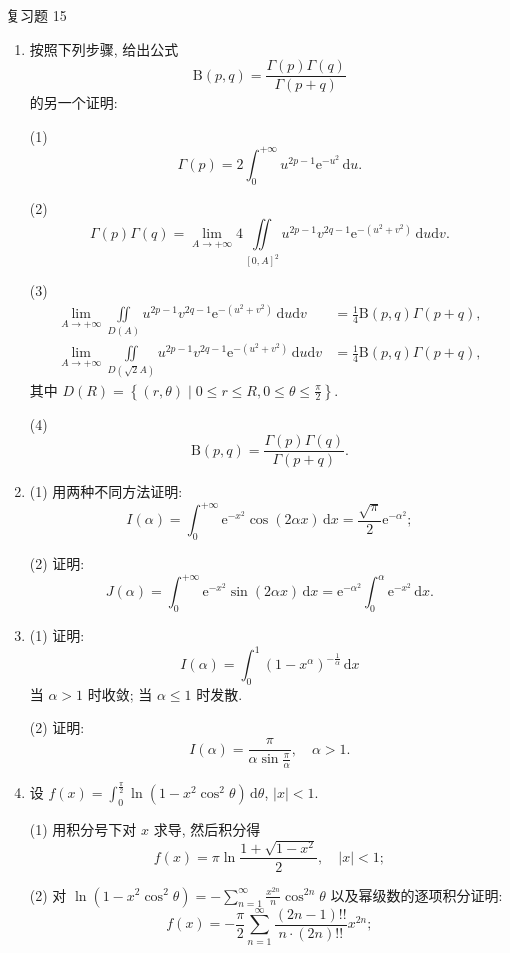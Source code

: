 \begin{exblock}{复习题 15}
\begin{enumerate}
  \item 按照下列步骤, 给出公式
  \[
    \mathrm{B}(p,q)=\frac{\Gamma(p)\Gamma(q)}{\Gamma(p+q)}
\]
  的另一个证明:

  (1)
  \[
    \Gamma(p)=2\int_{0}^{+\infty}u^{2p-1}\mathrm{e}^{-u^{2}}\,\mathrm{d}u.
\]

  (2)
  \[
    \Gamma(p)\Gamma(q)=\lim_{A\to+\infty}4\iint\limits_{[0,A]^{2}}u^{2p-1}v^{2q-1}\mathrm{e}^{-(u^{2}+v^{2})}\,\mathrm{d}u\mathrm{d}v.
\]

  (3)
  \[
    \begin{aligned}
      \lim_{A\to+\infty}\iint\limits_{D(A)}u^{2p-1}v^{2q-1}\mathrm{e}^{-(u^{2}+v^{2})}\,\mathrm{d}u\mathrm{d}v&=\frac{1}{4}\mathrm{B}(p,q)\Gamma(p+q),\\
      \lim_{A\to+\infty}\iint\limits_{D(\sqrt{2}A)}u^{2p-1}v^{2q-1}\mathrm{e}^{-(u^{2}+v^{2})}\,\mathrm{d}u\mathrm{d}v&=\frac{1}{4}\mathrm{B}(p,q)\Gamma(p+q),
    \end{aligned}
\]
  其中 $D(R)=\left\{(r,\theta)\mid 0\leqslant r\leqslant R, 0\leqslant\theta\leqslant\frac{\pi}{2}\right\}$.

  (4)
  \[
    \mathrm{B}(p,q)=\frac{\Gamma(p)\Gamma(q)}{\Gamma(p+q)}.
\]

  \item (1) 用两种不同方法证明:
  \[
    I(\alpha)=\int_{0}^{+\infty}\mathrm{e}^{-x^{2}}\cos(2\alpha x)\,\mathrm{d}x=\frac{\sqrt{\pi}}{2}\mathrm{e}^{-\alpha^{2}};
\]

  (2) 证明:
  \[
    J(\alpha)=\int_{0}^{+\infty}\mathrm{e}^{-x^{2}}\sin(2\alpha x)\,\mathrm{d}x=\mathrm{e}^{-\alpha^{2}}\int_{0}^{\alpha}\mathrm{e}^{-x^{2}}\,\mathrm{d}x.
\]

  \item (1) 证明:
  \[
    I(\alpha)=\int_{0}^{1}(1-x^{\alpha})^{-\frac{1}{\alpha}}\,\mathrm{d}x
\]
  当 $\alpha>1$ 时收敛; 当 $\alpha\leqslant 1$ 时发散.

  (2) 证明:
  \[
    I(\alpha)=\frac{\pi}{\alpha\sin\frac{\pi}{\alpha}},\quad\alpha>1.
\]

  \item 设 $\displaystyle f(x)=\int_{0}^{\frac{\pi}{2}}\ln(1-x^{2}\cos^{2}\theta)\,\mathrm{d}\theta$, $|x|<1$.

  (1) 用积分号下对 $x$ 求导, 然后积分得
  \[
    f(x)=\pi\ln\frac{1+\sqrt{1-x^{2}}}{2},\quad |x|<1;
\]

  (2) 对 $\displaystyle\ln(1-x^{2}\cos^{2}\theta)=-\sum_{n=1}^{\infty}\frac{x^{2n}}{n}\cos^{2n}\theta$ 以及幂级数的逐项积分证明:
  \[
    f(x)=-\frac{\pi}{2}\sum_{n=1}^{\infty}\frac{(2n-1)!!}{n\cdot(2n)!!}x^{2n};
\]


\end{enumerate}
\end{exblock}
